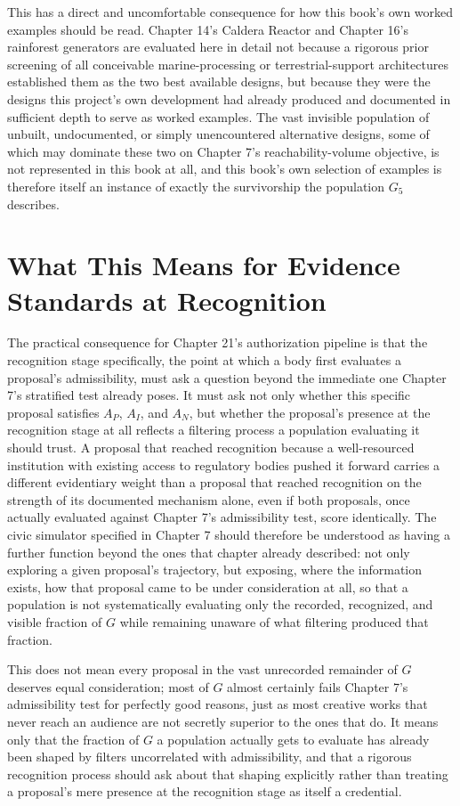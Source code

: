 \documentclass[11pt,oneside]{book}
\begin{document}
This has a direct and uncomfortable consequence for how this book's own worked examples should be read. Chapter 14's Caldera Reactor and Chapter 16's rainforest generators are evaluated here in detail not because a rigorous prior screening of all conceivable marine-processing or terrestrial-support architectures established them as the two best available designs, but because they were the designs this project's own development had already produced and documented in sufficient depth to serve as worked examples. The vast invisible population of unbuilt, undocumented, or simply unencountered alternative designs, some of which may dominate these two on Chapter 7's reachability-volume objective, is not represented in this book at all, and this book's own selection of examples is therefore itself an instance of exactly the survivorship the population $G_5$ describes.

\section*{What This Means for Evidence Standards at Recognition}

The practical consequence for Chapter 21's authorization pipeline is that the recognition stage specifically, the point at which a body first evaluates a proposal's admissibility, must ask a question beyond the immediate one Chapter 7's stratified test already poses. It must ask not only whether this specific proposal satisfies $A_P$, $A_I$, and $A_N$, but whether the proposal's presence at the recognition stage at all reflects a filtering process a population evaluating it should trust. A proposal that reached recognition because a well-resourced institution with existing access to regulatory bodies pushed it forward carries a different evidentiary weight than a proposal that reached recognition on the strength of its documented mechanism alone, even if both proposals, once actually evaluated against Chapter 7's admissibility test, score identically. The civic simulator specified in Chapter 7 should therefore be understood as having a further function beyond the ones that chapter already described: not only exploring a given proposal's trajectory, but exposing, where the information exists, how that proposal came to be under consideration at all, so that a population is not systematically evaluating only the recorded, recognized, and visible fraction of $G$ while remaining unaware of what filtering produced that fraction.

This does not mean every proposal in the vast unrecorded remainder of $G$ deserves equal consideration; most of $G$ almost certainly fails Chapter 7's admissibility test for perfectly good reasons, just as most creative works that never reach an audience are not secretly superior to the ones that do. It means only that the fraction of $G$ a population actually gets to evaluate has already been shaped by filters uncorrelated with admissibility, and that a rigorous recognition process should ask about that shaping explicitly rather than treating a proposal's mere presence at the recognition stage as itself a credential.
\end{document}
